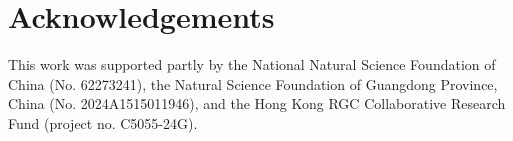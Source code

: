 \section*{Acknowledgements}
This work was supported partly by the National Natural Science Foundation of China (No. 62273241), the Natural Science Foundation of Guangdong Province, China (No. 2024A1515011946), and the Hong Kong RGC Collaborative Research Fund (project no. C5055-24G). 